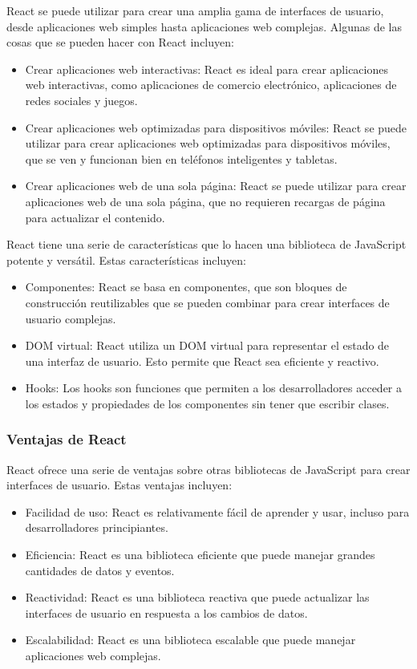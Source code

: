 React se puede utilizar para crear una amplia gama de interfaces de usuario, desde aplicaciones web simples hasta aplicaciones 
web complejas. Algunas de las cosas que se pueden hacer con React incluyen:

\begin{itemize}
    \item Crear aplicaciones web interactivas: React es ideal para crear aplicaciones web interactivas, como aplicaciones de comercio electrónico, aplicaciones de redes sociales y juegos.
    \item Crear aplicaciones web optimizadas para dispositivos móviles: React se puede utilizar para crear aplicaciones web optimizadas para dispositivos móviles, que se ven y funcionan bien en teléfonos inteligentes y tabletas.
    \item Crear aplicaciones web de una sola página: React se puede utilizar para crear aplicaciones web de una sola página, que no requieren recargas de página para actualizar el contenido.
\end{itemize}

React tiene una serie de características que lo hacen una biblioteca de JavaScript potente y versátil. Estas características incluyen:

\begin{itemize}
    \item Componentes: React se basa en componentes, que son bloques de construcción reutilizables que se pueden combinar para crear interfaces de usuario complejas.
    \item DOM virtual: React utiliza un DOM virtual para representar el estado de una interfaz de usuario. Esto permite que React sea eficiente y reactivo.
    \item Hooks: Los hooks son funciones que permiten a los desarrolladores acceder a los estados y propiedades de los componentes sin tener que escribir clases.
\end{itemize}

\subsubsection*{Ventajas de React}

React ofrece una serie de ventajas sobre otras bibliotecas de JavaScript para crear interfaces de usuario. Estas ventajas incluyen:
\begin{itemize}
    \item Facilidad de uso: React es relativamente fácil de aprender y usar, incluso para desarrolladores principiantes.
    \item Eficiencia: React es una biblioteca eficiente que puede manejar grandes cantidades de datos y eventos.
    \item Reactividad: React es una biblioteca reactiva que puede actualizar las interfaces de usuario en respuesta a los cambios de datos.
    \item Escalabilidad: React es una biblioteca escalable que puede manejar aplicaciones web complejas.
\end{itemize}